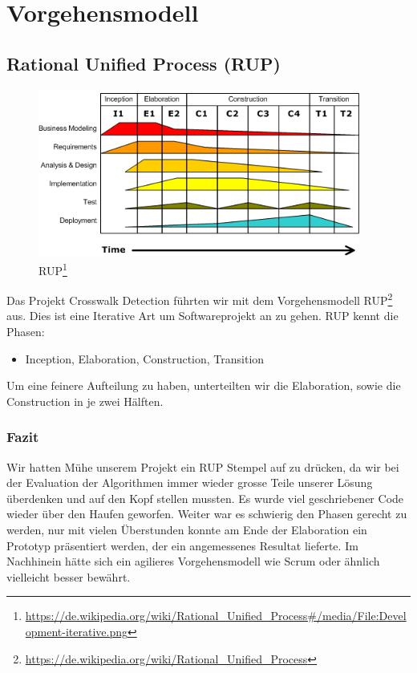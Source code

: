 \section{Vorgehensmodell}
\subsection{Rational Unified Process (RUP)}

\begin{figure}[H]
\centering
\includegraphics[width=300pt]{images/rup.png}
\caption[RUP]{RUP\footnote{\url{https://de.wikipedia.org/wiki/Rational_Unified_Process\#/media/File:Development-iterative.png}}}
\end{figure}

Das Projekt Crosswalk Detection führten wir mit dem Vorgehensmodell RUP\footnote{\url{https://de.wikipedia.org/wiki/Rational_Unified_Process}} aus.
Dies ist eine Iterative Art um Softwareprojekt an zu gehen. RUP kennt die Phasen:

\begin{itemize}
	\item Inception, Elaboration, Construction, Transition
\end{itemize}

Um eine feinere Aufteilung zu haben, unterteilten wir die Elaboration, sowie die Construction in je zwei Hälften. 

\subsubsection{Fazit}
Wir hatten Mühe unserem Projekt ein RUP Stempel auf zu drücken, da wir bei der Evaluation der Algorithmen immer wieder grosse Teile unserer Lösung überdenken und auf den Kopf stellen mussten. Es wurde viel geschriebener Code wieder über den Haufen geworfen. Weiter war es schwierig den Phasen gerecht zu werden, nur mit vielen Überstunden konnte am Ende der Elaboration ein Prototyp präsentiert werden, der ein angemessenes Resultat lieferte. Im Nachhinein hätte sich ein agilieres Vorgehensmodell wie Scrum oder ähnlich vielleicht besser bewährt.
 

